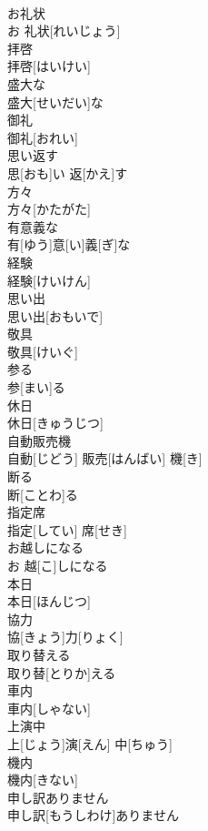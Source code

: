 \documentclass[8pt]{extreport}
\begin{document}
\begin{CJK}{UTF8}{min}
\\	お礼状	
\\	お 礼状[れいじょう]	
\\	拝啓	
\\	拝啓[はいけい]	
\\	盛大な	
\\	盛大[せいだい]な	
\\	御礼	
\\	御礼[おれい]	
\\	思い返す	
\\	思[おも]い 返[かえ]す	
\\	方々	
\\	方々[かたがた]	
\\	有意義な	
\\	有[ゆう]意[い]義[ぎ]な	
\\	経験	
\\	経験[けいけん]	
\\	思い出	
\\	思い出[おもいで]	
\\	敬具	
\\	敬具[けいぐ]	
\\	参る	
\\	参[まい]る	
\\	休日	
\\	休日[きゅうじつ]	
\\	自動販売機	
\\	自動[じどう] 販売[はんばい] 機[き]	
\\	断る	
\\	断[ことわ]る	
\\	指定席	
\\	指定[してい] 席[せき]	
\\	お越しになる	
\\	お 越[こ]しになる	
\\	本日	
\\	本日[ほんじつ]	
\\	協力	
\\	協[きょう]力[りょく]	
\\	取り替える	
\\	取り替[とりか]える	
\\	車内	
\\	車内[しゃない]	
\\	上演中	
\\	上[じょう]演[えん] 中[ちゅう]	
\\	機内	
\\	機内[きない]	
\\	申し訳ありません	
\\	申し訳[もうしわけ]ありません	

\end{CJK}
\end{document}
